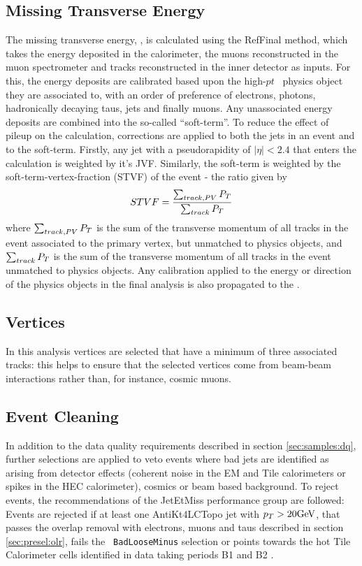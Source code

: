 \subsection{Missing Transverse Energy}
\label{sec:presel:met}

The missing transverse energy, \met, is calculated using the
RefFinal method, which takes the energy
deposited in the calorimeter, the muons reconstructed in the muon
spectrometer and tracks reconstructed in the inner detector as inputs. 
For this, the energy deposits are calibrated based
upon the high-$pt$~ physics object they are associated to, with an order
of preference of electrons, photons, hadronically decaying taus, jets
and finally muons. Any unassociated energy deposits are combined into
the so-called ``soft-term''. To reduce the effect of pileup on the
\met calculation, corrections are applied to both the jets in an event
and to the soft-term. Firstly, any jet with a pseudorapidity of $|\eta|<2.4$
that enters the \met calculation is weighted by it's JVF. Similarly,
the soft-term is weighted by the soft-term-vertex-fraction (STVF) of
the event - the ratio given by
\begin{equation}
STVF = \frac{\sum_{track, PV}P_{T}}{\sum_{track}P_{T}}
\end{equation}
where $\sum_{track, PV}P_{T}$ is the sum of the transverse momentum of
all tracks in the event associated to the primary vertex, but unmatched to physics
objects, and $\sum_{track}P_{T}$ is the sum of
the transverse momentum of all tracks in the event unmatched to
physics objects. Any calibration applied
to the energy or direction of the physics objects in the final
analysis is also propagated to the \met.


\subsection{Vertices} 
\label{sec:presel:vertices}
In this analysis vertices are selected that have a minimum of three
associated tracks: this helps to ensure that the selected vertices
come from beam-beam interactions rather than, for instance, cosmic
muons.

\subsection{Event Cleaning}
\label{sec:presel:celaning}

In addition to the data quality requirements described in section
\ref{sec:samples:dq}, further selections are applied to veto events
where bad jets are identified as arising from detector effects
(coherent noise in the EM and Tile calorimeters or spikes in the HEC
calorimeter), cosmics or beam based background. To reject events, the
recommendations of the JetEtMiss performance group \cite{TWIKI_JETMET}
are followed: Events are rejected if at least one AntiKt4LCTopo jet
with $p_T>20\text{GeV}$, that passes the overlap removal with electrons,
muons and taus described in section \ref{sec:presel:olr}, fails the {\tt
BadLooseMinus} selection or points towards the hot Tile Calorimeter
cells identified in data taking periods B1 and B2 \cite{hottile}.

